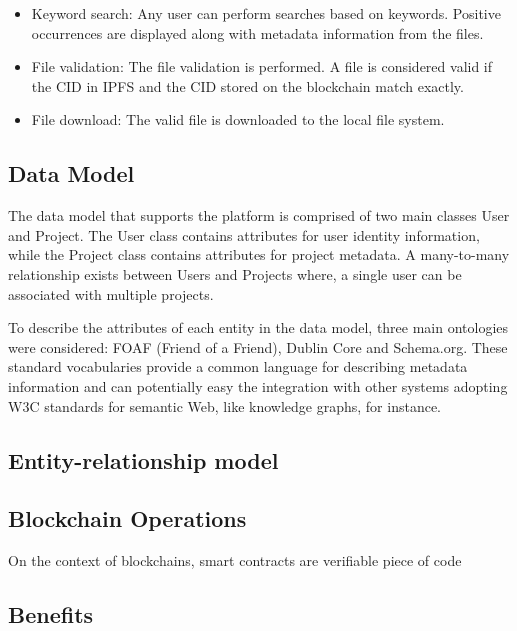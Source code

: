 \documentclass{article}
\begin{document}
\begin{itemize}
      \item Keyword search:
            \indent Any user can perform searches based on keywords. Positive occurrences are displayed along with metadata information from the files.

      \item File validation:
            \indent The file validation is performed. A file is considered valid if the CID in IPFS and the CID stored on the blockchain match exactly.

      \item File download:
            \indent The valid file is downloaded to the local file system.
\end{itemize}



\subsection{Data Model}

The data model that supports the platform is comprised of two main classes User and Project. The User class contains attributes for user identity information, while the Project class contains attributes for project metadata. A many-to-many relationship exists between Users and Projects where, a single user can be associated with multiple projects.

To describe the attributes of each entity in the data model, three main ontologies were considered: FOAF (Friend of a Friend), Dublin Core and Schema.org. These standard vocabularies provide a common language for describing metadata information and can potentially easy the integration with other systems adopting W3C standards for semantic Web, like knowledge graphs, for instance.

\subsection{Entity-relationship model}



\subsection{Blockchain Operations}

On the context of blockchains, smart contracts are verifiable piece of code


\subsection{Benefits}
\end{document}
